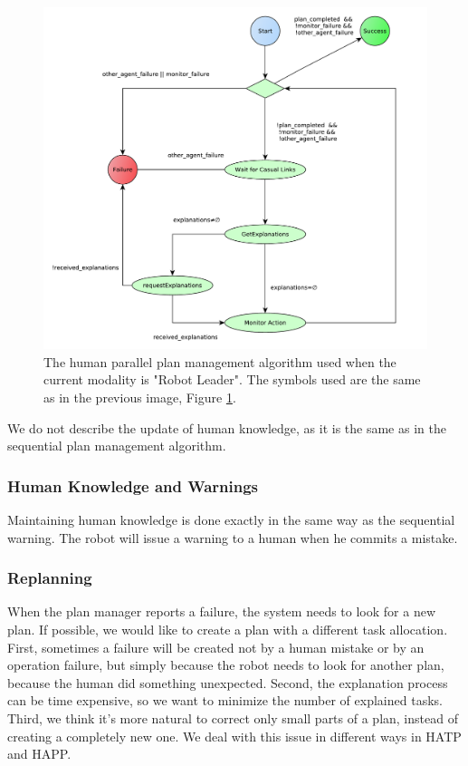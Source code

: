 \begin{figure}[ht!]
 \centering
 \includegraphics[]{img/plan_management/manage_plan_leader_humans.pdf}
 \caption{The human parallel plan management algorithm used when the current modality is "Robot Leader". The symbols used are the same as in the previous image, Figure \ref{fig:plan_management-manage_plan_leader_control_block}.}
 \label{fig:plan_management-manage_plan_leader_control_block}
 \end{figure}


We do not describe the update of human knowledge, as it is the same as in the sequential plan management algorithm.



\subsubsection{Human Knowledge and Warnings}
Maintaining human knowledge is done exactly in the same way as the sequential warning. The robot will issue a warning to a human when he commits a mistake.

\subsubsection{Replanning}
When the plan manager reports a failure, the system needs to look for a new plan. If possible, we would like to create a plan with a different task allocation. First, sometimes a failure will be created not by a human mistake or by an operation failure, but simply because the robot needs to look for another plan, because the human did something unexpected. Second, the explanation process can be time expensive, so we want to minimize the number of explained tasks. Third, we think it's more natural to correct only small parts of a plan, instead of creating a completely new one. We deal with this issue in different ways in HATP and HAPP.

